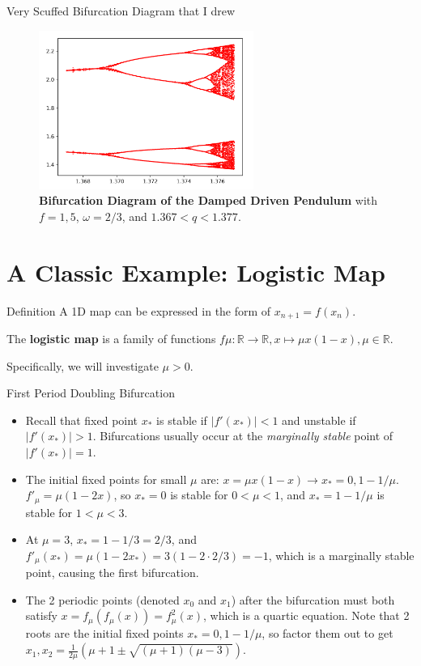 \documentclass[aspectratio=169]{beamer}
\begin{document}
\begin{frame}{Very Scuffed Bifurcation Diagram that I drew}
    \begin{figure}[htp]
        \centering
        \includegraphics[width=7cm]{images/bifurcation.png}
        \caption{\textbf{Bifurcation Diagram of the Damped Driven Pendulum} with $f = 1,5$, $\omega = 2/3$, and $1.367 < q < 1.377$.}
        \label{fig:Bifurcation}
    \end{figure}
\end{frame}

\section{A Classic Example: Logistic Map}
\frame{\sectionpage}

\begin{frame}{Definition}
    A 1D map can be expressed in the form of $x_{n+1} = f(x_n)$. 
    \begin{defn}
        The \textbf{logistic map} is a family of functions $f\mu: \mathbb{R}\rightarrow \mathbb{R}, x \mapsto \mu x(1-x),\mu\in\mathbb{R}$.
    \end{defn}
    Specifically, we will investigate $\mu>0$.
\end{frame}

\begin{frame}{First Period Doubling Bifurcation}
\begin{itemize}
        \item Recall that fixed point $x_*$ is stable if $\lvert f'(x_*) \rvert < 1$ and unstable if $\lvert f'(x_*) \rvert > 1$. Bifurcations usually occur at the \textit{marginally stable} point of $\lvert f'(x_*) \rvert = 1$. 
    \item The initial fixed points for small $\mu$ are: $x = \mu x(1-x) \rightarrow x_* = 0, 1-1/\mu$. $f'_\mu = \mu(1-2x)$, so $x_* = 0$ is stable for $0 < \mu < 1$, and $x_* = 1-1/\mu$ is stable for $1 < \mu < 3$.
    \item At $\mu = 3$, $x_* = 1-1/3 = 2/3$, and $f'_\mu(x_*) = \mu(1-2x_*) = 3(1-2 \cdot 2/3) = -1$, which is a marginally stable point, causing the first bifurcation.
    \item The 2 periodic points (denoted $x_0$ and $x_1$) after the bifurcation must both satisfy $x = f_\mu(f_\mu(x)) = f_\mu^2(x)$, which is a quartic equation. Note that 2 roots are the initial fixed points $x_* = 0, 1-1/\mu$, so factor them out to get $ x_1, x_2 = \frac{1}{2\mu}(\mu+1 \pm \sqrt{(\mu+1)(\mu-3)})$.
\end{itemize}
\end{frame}
\end{document}
